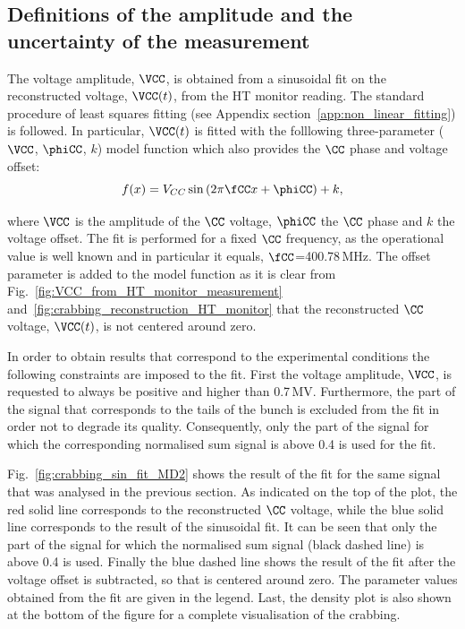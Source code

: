 \subsection{Definitions of the amplitude and the uncertainty of the measurement}\label{subsec:def_amplt_uncertainty}
The voltage amplitude, $\VCC$, is obtained from a sinusoidal fit on the reconstructed voltage, $\VCC (t)$, from the HT monitor reading. The standard procedure of least squares fitting (see Appendix section~\ref{app:non_linear_fitting}) is followed. In particular, $\VCC (t)$ is fitted with the folllowing three-parameter ($\VCC$, $\phiCC$, $k$) model function which also provides the $\CC$ phase and voltage offset:
\begin{equation}\label{eq:sin_fit_cc}
   f(x) = V_{CC}\sin{(2\pi \fCC x + \phiCC)} + k ,
\end{equation}

where $\VCC$ is the amplitude of the $\CC$ voltage, $\phiCC$ the $\CC$ phase and
$k$ the voltage offset. The fit is performed for a fixed $\CC$ frequency, as the operational value is well known and in particular it equals, $\fCC$=400.78\,MHz. The offset parameter is added to the model function as it is clear from Fig.~\ref{fig:VCC_from_HT_monitor_measurement} and~\ref{fig:crabbing_reconstruction_HT_monitor} that the reconstructed $\CC$ voltage, $\VCC(t)$, is not centered around zero.

In order to obtain results that correspond to the experimental conditions the following constraints are imposed to the fit. First the voltage amplitude, $\VCC$, is requested to always be positive and higher than 0.7\,MV. Furthermore, the part of the signal that corresponds to the tails of the bunch is excluded from the fit in order not to degrade its quality. Consequently, only the part of the signal for which the corresponding normalised sum signal is above 0.4 is used for the fit. 

Fig.~\ref{fig:crabbing_sin_fit_MD2} shows the result of the fit for the same signal that was analysed in the previous section. As indicated on the top of the plot, the red solid line corresponds to the reconstructed $\CC$ voltage, while the blue solid line corresponds to the result of the sinusoidal fit. It can be seen that only the part of the signal for which the normalised sum signal (black dashed line) is above 0.4 is used. Finally the blue dashed line shows the result of the fit after the voltage offset is subtracted, so that is centered around zero. The parameter values obtained from the fit are given in the legend. Last, the density plot is also shown at the bottom of the figure for a complete visualisation of the crabbing. 

